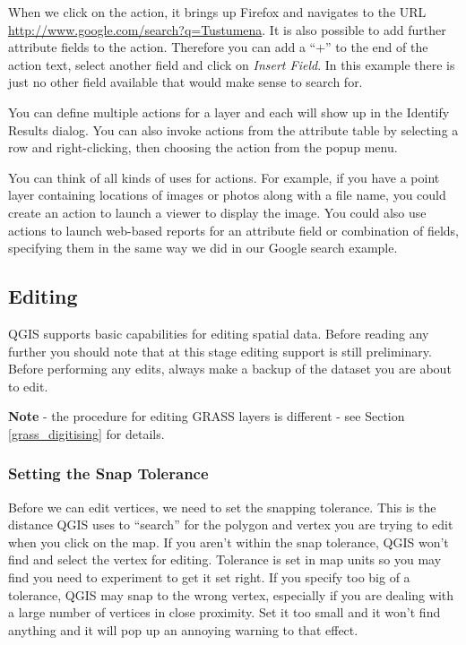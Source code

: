 When we click on the action, it brings up Firefox and navigates to the URL
\url{http://www.google.com/search?q=Tustumena}. It is also possible to add further 
attribute fields to the action. Therefore you can add a ``+'' to the end of the action 
text, select another field and click on \textsl{Insert Field}. In this example there 
is just no other field available that would make sense to search for.

You can define multiple actions for a layer and each will show up in the
Identify Results dialog. You can also invoke actions from the attribute table
by selecting a row and right-clicking, then choosing the action from the popup
menu.

You can think of all kinds of uses for actions. For example, if you have a point layer
containing locations of images or photos along with a file name, you could
create an action to launch a viewer to display the image. You could also use
actions to launch web-based reports for an attribute field or combination of
fields, specifying them in the same way we did in our Google search example.

\subsection{Editing}

QGIS supports basic capabilities for editing spatial data.  Before reading any
further you should note that at this stage editing support is still preliminary.
Before performing any edits, always make a backup of the dataset you are about
to edit. 

\textbf{Note} - the procedure for editing GRASS layers is different - see
Section \ref{grass_digitising} for details.

\subsubsection{Setting the Snap Tolerance}

Before we can edit vertices, we need to set the snapping tolerance. This is the 
distance QGIS uses to ``search'' for the polygon and vertex you are trying to
edit when you click on the map. If you aren't within the snap tolerance,
QGIS won't find and select the vertex for editing. Tolerance is set in map
units so you may find you need to experiment to get it set right. If you
specify too big of a tolerance, QGIS may snap to the wrong vertex,
especially if you are dealing with a large number of vertices in close
proximity. Set it too small and it won't find anything and it will pop up an
annoying warning to that effect. 

